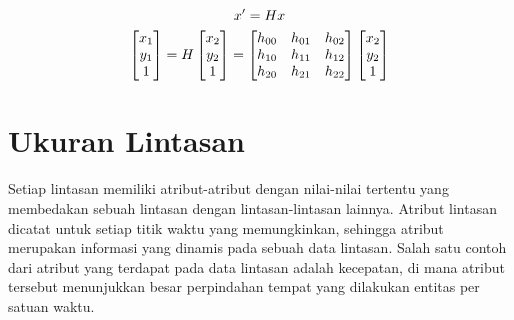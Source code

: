 \begin{equation}
    \begin{gathered}
        x' = H x \\
        \begin{bmatrix}
            x_1 \\
            y_1 \\
            1
        \end{bmatrix} = H
        \begin{bmatrix}
            x_2 \\
            y_2 \\
            1
        \end{bmatrix} = 
        \begin{bmatrix}
            h\textsubscript{00} & h\textsubscript{01} & h\textsubscript{02} \\
            h\textsubscript{10} & h\textsubscript{11} & h\textsubscript{12} \\
            h\textsubscript{20} & h\textsubscript{21} & h\textsubscript{22}
        \end{bmatrix}
        \begin{bmatrix}
            x_2 \\
            y_2 \\
            1
        \end{bmatrix}
    \end{gathered}
    \label{bab2:rumus-homografi}
\end{equation}

\section{Ukuran Lintasan}
\label{sec:ukuran}

Setiap lintasan memiliki atribut-atribut dengan nilai-nilai tertentu yang membedakan sebuah lintasan dengan lintasan-lintasan lainnya. Atribut lintasan dicatat untuk setiap titik waktu yang memungkinkan, sehingga atribut merupakan informasi yang dinamis pada sebuah data lintasan. Salah satu contoh dari atribut yang terdapat pada data lintasan adalah kecepatan, di mana atribut tersebut menunjukkan besar perpindahan tempat yang dilakukan entitas per satuan waktu.

